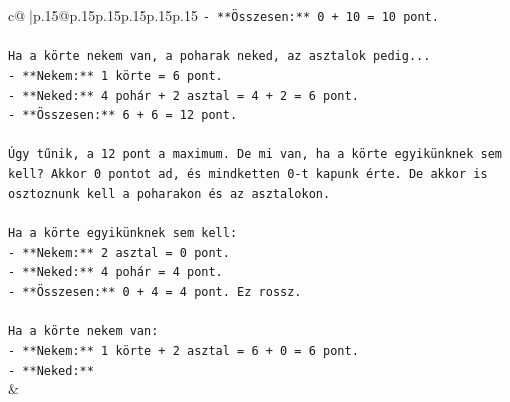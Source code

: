 \documentclass{article}
\begin{document}
{\begin{supertabular}{c@{$\;$}|p{.15\linewidth}@{}p{.15\linewidth}p{.15\linewidth}p{.15\linewidth}p{.15\linewidth}p{.15\linewidth}}
{{{\texttt{{-} **Összesen:** 0 + 10 = 10 pont.} \\
\\ 
\texttt{Ha a körte nekem van, a poharak neked, az asztalok pedig...} \\
\texttt{{-} **Nekem:** 1 körte = 6 pont.} \\
\texttt{{-} **Neked:** 4 pohár + 2 asztal = 4 + 2 = 6 pont.} \\
\texttt{{-} **Összesen:** 6 + 6 = 12 pont.} \\
\\ 
\texttt{Úgy tűnik, a 12 pont a maximum. De mi van, ha a körte egyikünknek sem kell? Akkor 0 pontot ad, és mindketten 0{-}t kapunk érte. De akkor is osztoznunk kell a poharakon és az asztalokon.} \\
\\ 
\texttt{Ha a körte egyikünknek sem kell:} \\
\texttt{{-} **Nekem:** 2 asztal = 0 pont.} \\
\texttt{{-} **Neked:** 4 pohár = 4 pont.} \\
\texttt{{-} **Összesen:** 0 + 4 = 4 pont. Ez rossz.} \\
\\ 
\texttt{Ha a körte nekem van:} \\
\texttt{{-} **Nekem:** 1 körte + 2 asztal = 6 + 0 = 6 pont.} \\
\texttt{{-} **Neked:**} \\
            }
        }
    }
    & \\ \\


\end{supertabular}}
\end{document}
